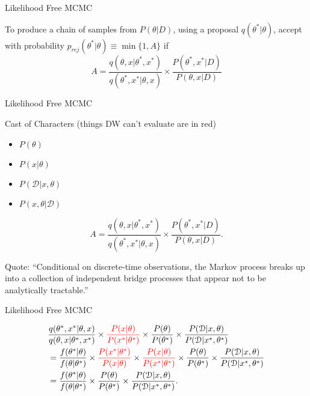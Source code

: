 \documentclass[12pt,a4paper,t,xcolor=dvipsnames,slidestop,compress,mathserif]{beamer}
\newcommand{\red}[1]{{\color{red}#1}}
\begin{document}
\begin{frame}{Likelihood Free MCMC}

To produce a chain of samples from $P(\theta|D)$, using a proposal $q(\theta^*|\theta)$, accept with probability $p_{rej}(\theta^*|\theta)\equiv\min \{1, A\}$ if $$A=\frac{q(\theta,x|\theta^*,x^*)}{q(\theta^*,x^*|\theta,x)} \times \frac{P(\theta^*,x^*|D)}{P(\theta,x|D)}
$$

\end{frame}
\begin{frame}{Likelihood Free MCMC}

Cast of Characters (\red{things DW can't evaluate are in red})
\begin{itemize}
\item ${P(\theta)}$
\item \red{${P(x|\theta)}$}
\item ${P(\mathcal{D}|x, \theta)}$
\item \red{${P(x, \theta|\mathcal{D})}$} 
\end{itemize}

$$A=\frac{q(\theta,x|\theta^*,x^*)}{q(\theta^*,x^*|\theta,x)} \times \frac{P(\theta^*,x^*|D)}{P(\theta,x|D)}.$$ 

Quote: ``Conditional on discrete-time observations, the Markov process breaks up into a collection of independent bridge processes that appear not to be analytically tractable.''

\end{frame}

\begin{frame}{Likelihood Free MCMC}

\begin{align*}
&\frac{q(\theta^*, x^*|\theta, x)}{q(\theta, x|\theta^*, x^*)}
\times 
\red{\frac{P(x| \theta)}{P(x^*| \theta^*)}}
\times 
\frac{ P( \theta)}{ P( \theta^*)}
\times 
\frac{P(\mathcal{D}|x, \theta)}{P(\mathcal{D}|x^*, \theta^*)}\\
&=\frac{f(\theta^*|\theta)}{f(\theta|\theta^*)}
\times 
\red{\frac{P(x^*| \theta^*)}{P(x| \theta)} }
\times 
\red{\frac{P(x| \theta)}{P(x^*| \theta^*)} }
\times 
\frac{ P( \theta)}{ P( \theta^*)}
\times 
\frac{P(\mathcal{D}|x, \theta)}{P(\mathcal{D}|x^*, \theta^*)}\\
&=\frac{f(\theta^*|\theta)}{f(\theta|\theta^*)}
\times 
\frac{ P( \theta)}{ P( \theta^*)}
\times 
\frac{P(\mathcal{D}|x, \theta)}{P(\mathcal{D}|x^*, \theta^*)}.
\end{align*}

\end{frame}
%
%
\end{document}
